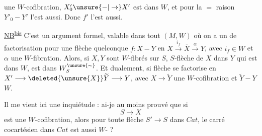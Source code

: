
une $W$-cofibration, $X'_0\unsure{-|\to}X'$ est dans $W$, et pour la $=$ raison $Y'_0-Y'$ l'est aussi. Donc $f'$ l'est aussi.

\uline{NB}\textsuperscript{\uline{bis}} C'est un argument formel,  valable  dans tout $(M,W)$ où on a un  de factorisation pour une flèche quelconque $f:X-Y$ en $X\xrightarrow{i_f}\overline X\xrightarrow{\alpha}Y$, avec $i_f\in W$ et $\alpha$ une $W$-fibration. Alors, si $X,Y$ sont $W$-fibrés sur $S$,   $S$-flèche de $X$ dans $Y$ qui est dans $W$, est dans $W_S^{\unsure{\sim}}$. Et dualement, si  flèche  se factorise en $X'\longrightarrow\deleted{\unsure{X}}\widetilde Y\longrightarrow Y$, avec $X\longrightarrow\widetilde Y$ une $W$-cofibration et $\widetilde Y-Y$  $W$.

Il me vient ici une  inquiétude : ai-je au moins prouvé que si
\[
S\longrightarrow X
\]
est une $W$-cofibration, alors pour toute flèche $S'\longrightarrow S$ dans $Cat$, le carré cocartésien dans $Cat$
est aussi $W$-   ? 


